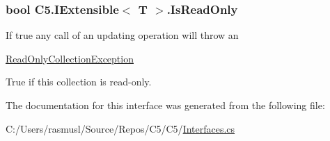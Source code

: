 \subsubsection[{Is\+Read\+Only}]{\setlength{\rightskip}{0pt plus 5cm}bool {\bf C5.\+I\+Extensible}$<$ T $>$.Is\+Read\+Only\hspace{0.3cm}{\ttfamily [get]}}\label{interface_c5_1_1_i_extensible_aedb0e17cd4e5d0f4a63750a5989b6706}


If true any call of an updating operation will throw an 

{\ttfamily \hyperlink{class_c5_1_1_read_only_collection_exception}{Read\+Only\+Collection\+Exception}} 

True if this collection is read-\/only.

The documentation for this interface was generated from the following file\+:\begin{DoxyCompactItemize}
\item 
C\+:/\+Users/rasmusl/\+Source/\+Repos/\+C5/\+C5/\hyperlink{_interfaces_8cs}{Interfaces.\+cs}\end{DoxyCompactItemize}
